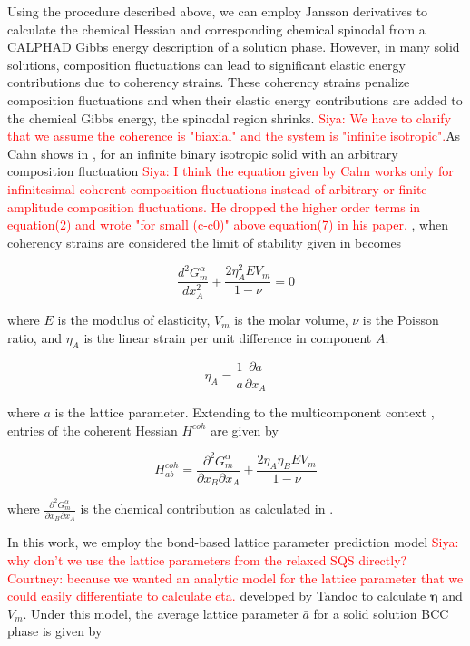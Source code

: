 Using the procedure described above, we can employ Jansson derivatives to calculate the chemical Hessian and corresponding chemical spinodal from a CALPHAD Gibbs energy description of a solution phase. However, in many solid solutions, composition fluctuations can lead to significant elastic energy contributions due to coherency strains. These coherency strains penalize composition fluctuations and when their elastic energy contributions are added to the chemical Gibbs energy, the spinodal region shrinks. \textcolor{red}{Siya: We have to clarify that we assume the coherence is "biaxial" and the system is "infinite isotropic".}As Cahn shows in \cite{cahn1961spinodal}, for an infinite binary isotropic solid with an arbitrary composition fluctuation \textcolor{red}{Siya: I think the equation given by Cahn works only for infinitesimal coherent composition fluctuations instead of arbitrary or finite-amplitude composition fluctuations. He dropped the higher order terms in equation(2) and wrote "for small (c-c0)" above equation(7) in his paper.} , when coherency strains are considered the limit of stability given in  becomes

\begin{equation}
    \frac{d^2G^\alpha_m}{dx^2_A}+\frac{2\eta_A^2EV_m}{1-\nu}=0
\end{equation}

\noindent where $E$ is the modulus of elasticity, $V_m$ is the molar volume, $\nu$ is the Poisson ratio, and $\eta_A$ is the linear strain per unit difference in component $A$:

\begin{equation}
\eta_A=\frac{1}{a}\frac{\partial a}{\partial x_A}
\end{equation}

\noindent where $a$ is the lattice parameter. Extending to the multicomponent context \cite{de1973analysis}, entries of the coherent Hessian $H^{coh}$ are given by

\begin{equation}
    H^{coh}_{ab}=\frac{\partial^2G^\alpha_m}{\partial x_B\partial x_A}+\frac{2\eta_A\eta_BEV_m}{1-\nu}
\end{equation}

\noindent where $\frac{\partial^2G^\alpha_m}{\partial x_B\partial x_A}$ is the chemical contribution as calculated in .

In this work, we employ the bond-based lattice parameter prediction model \textcolor{red}{Siya: why don't we use the lattice parameters from the relaxed SQS directly? Courtney: because we wanted an analytic model for the lattice parameter that we could easily differentiate to calculate eta.} developed by Tandoc \etal \cite{tandoc2025bond} to calculate $\boldsymbol{\eta}$ and $V_m$. Under this model, the average lattice parameter $\bar{a}$ for a solid solution BCC phase is given by


